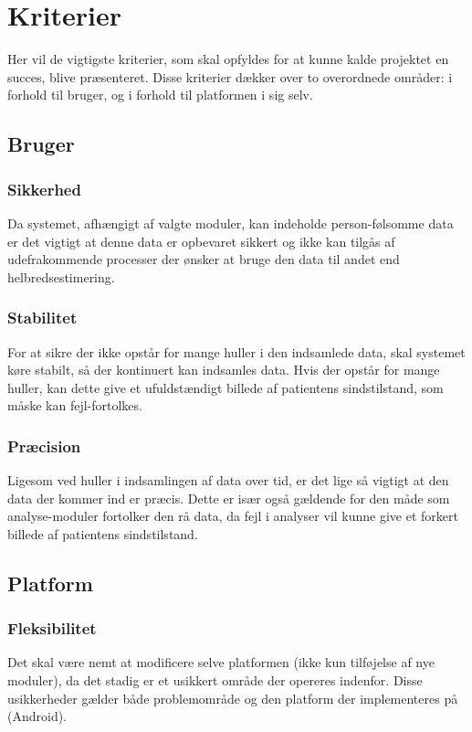 \section{Kriterier}
Her vil de vigtigste kriterier, som skal opfyldes for at kunne kalde projektet en succes, blive præsenteret.
Disse kriterier dækker over to overordnede områder: i forhold til bruger, og i forhold til platformen i sig selv.

\subsection{Bruger}

\subsubsection{Sikkerhed}
Da systemet, afhængigt af valgte moduler, kan indeholde person-følsomme data er det vigtigt at denne data er opbevaret sikkert og ikke kan tilgås af udefrakommende processer der ønsker at bruge den data til andet end helbredsestimering.

\subsubsection{Stabilitet}
For at sikre der ikke opstår for mange huller i den indsamlede data, skal systemet køre stabilt, så der kontinuert kan indsamles data.
Hvis der opstår for mange huller, kan dette give et ufuldstændigt billede af patientens sindstilstand, som måske kan fejl-fortolkes.

\subsubsection{Præcision}
Ligesom ved huller i indsamlingen af data over tid, er det lige så vigtigt at den data der kommer ind er præcis.
Dette er især også gældende for den måde som analyse-moduler fortolker den rå data, da fejl i analyser vil kunne give et forkert billede af patientens sindstilstand.

\subsection{Platform}

\subsubsection{Fleksibilitet}
Det skal være nemt at modificere selve platformen (ikke kun tilføjelse af nye moduler), da det stadig er et usikkert område der opereres indenfor.
Disse usikkerheder gælder både problemområde og den platform der implementeres på (Android).

